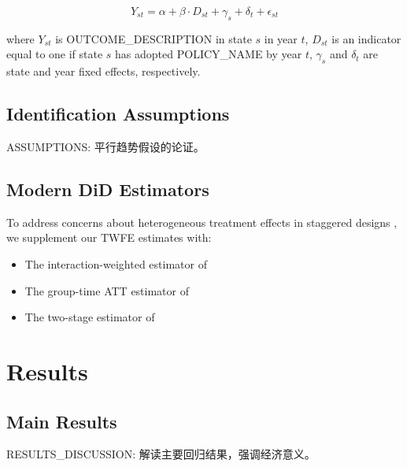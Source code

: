 \documentclass[12pt]{article}
\begin{document}
\begin{equation}
Y_{st} = \alpha + \beta \cdot D_{st} + \gamma_s + \delta_t + \epsilon_{st}
\label{eq:main}
\end{equation}

where $Y_{st}$ is {OUTCOME_DESCRIPTION} in state $s$ in year $t$, $D_{st}$ is an indicator equal to one if state $s$ has adopted {POLICY_NAME} by year $t$, $\gamma_s$ and $\delta_t$ are state and year fixed effects, respectively.


\subsection{Identification Assumptions}
{ASSUMPTIONS: 平行趋势假设的论证。}

\subsection{Modern DiD Estimators}
To address concerns about heterogeneous treatment effects in staggered designs \citep{goodman-bacon2021}, we supplement our TWFE estimates with:
\begin{itemize}
    \item The interaction-weighted estimator of \citet{sun-abraham2021}
    \item The group-time ATT estimator of \citet{callaway-santanna2021}
    \item The two-stage estimator of \citet{gardner2022}
\end{itemize}

\section{Results} \label{sec:results}

\subsection{Main Results}


{RESULTS_DISCUSSION: 解读主要回归结果，强调经济意义。}
\end{document}
